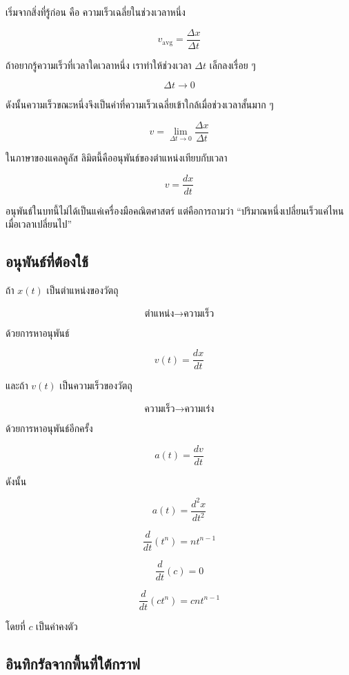 \documentclass[12pt,a4paper]{report}
\begin{document}
เริ่มจากสิ่งที่รู้ก่อน คือ ความเร็วเฉลี่ยในช่วงเวลาหนึ่ง

\[
v_{\text{avg}} = \frac{\Delta x}{\Delta t}
\]

ถ้าอยากรู้ความเร็วที่เวลาใดเวลาหนึ่ง เราทำให้ช่วงเวลา $\Delta t$ เล็กลงเรื่อย ๆ

\[
\Delta t \to 0
\]

ดังนั้นความเร็วขณะหนึ่งจึงเป็นค่าที่ความเร็วเฉลี่ยเข้าใกล้เมื่อช่วงเวลาสั้นมาก ๆ

\[
v = \lim_{\Delta t \to 0}\frac{\Delta x}{\Delta t}
\]

ในภาษาของแคลคูลัส ลิมิตนี้คืออนุพันธ์ของตำแหน่งเทียบกับเวลา

\[
v = \frac{dx}{dt}
\]

\begin{tcolorbox}[title=ความหมาย]
อนุพันธ์ในบทนี้ไม่ได้เป็นแค่เครื่องมือคณิตศาสตร์ แต่คือการถามว่า ``ปริมาณหนึ่งเปลี่ยนเร็วแค่ไหนเมื่อเวลาเปลี่ยนไป''
\end{tcolorbox}

\subsection{อนุพันธ์ที่ต้องใช้}

ถ้า $x(t)$ เป็นตำแหน่งของวัตถุ

\[
\text{ตำแหน่ง} \longrightarrow \text{ความเร็ว}
\]

ด้วยการหาอนุพันธ์

\[
v(t)=\frac{dx}{dt}
\]

และถ้า $v(t)$ เป็นความเร็วของวัตถุ

\[
\text{ความเร็ว} \longrightarrow \text{ความเร่ง}
\]

ด้วยการหาอนุพันธ์อีกครั้ง

\[
a(t)=\frac{dv}{dt}
\]

ดังนั้น

\[
a(t)=\frac{d^2x}{dt^2}
\]

\begin{tcolorbox}[title=สูตรอนุพันธ์พื้นฐาน]
\[
\frac{d}{dt}(t^n)=nt^{n-1}
\]

\[
\frac{d}{dt}(c)=0
\]

\[
\frac{d}{dt}(ct^n)=cnt^{n-1}
\]

โดยที่ $c$ เป็นค่าคงตัว
\end{tcolorbox}

\subsection{อินทิกรัลจากพื้นที่ใต้กราฟ}
\end{document}
